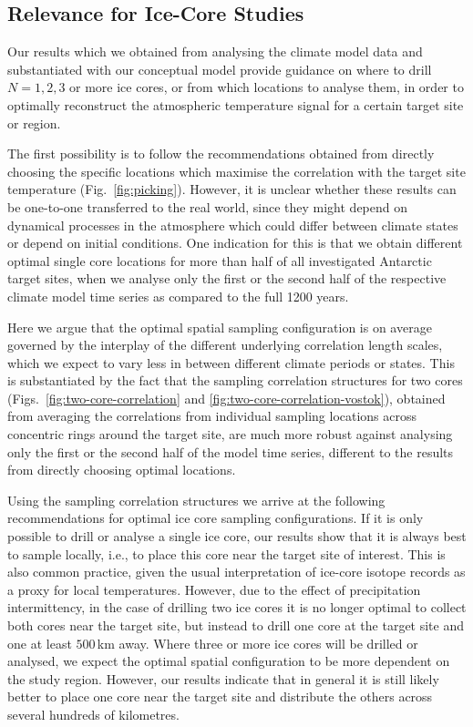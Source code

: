 \documentclass[draft]{agujournal2019}
\begin{document}
\subsection{Relevance for Ice-Core Studies}
\label{discussion:relevance}

Our results which we obtained from analysing the climate model data and
substantiated with our conceptual model provide guidance on where to drill
$N=1, 2, 3$ or more ice cores, or from which locations to analyse them, in order
to optimally reconstruct the atmospheric temperature signal for a certain target
site or region.

The first possibility is to follow the recommendations obtained from directly
choosing the specific locations which maximise the correlation with the target
site temperature (Fig.~\ref{fig:picking}). However, it is unclear whether these
results can be one-to-one transferred to the real world, since they might depend
on dynamical processes in the atmosphere which could differ between climate
states or depend on initial conditions. One indication for this is that we
obtain different optimal single core locations for more than half of all
investigated Antarctic target sites, when we analyse only the first or the
second half of the respective climate model time series as compared to the full
1200 years.

Here we argue that the optimal spatial sampling configuration is on average
governed by the interplay of the different underlying correlation length scales,
which we expect to vary less in between different climate periods or states.
This is substantiated by the fact that the sampling correlation structures for
two cores (Figs.~\ref{fig:two-core-correlation} and
\ref{fig:two-core-correlation-vostok}), obtained from averaging the correlations
from individual sampling locations  across concentric rings around the target
site, are much more robust against analysing only the first or the second half
of the model time series, different to the results from directly choosing
optimal locations.

Using the sampling correlation structures we arrive at the following
recommendations for optimal ice core sampling configurations. If it is only
possible to drill or analyse a single ice core, our results show that it is
always best to sample locally, i.e., to place this core near the target site of
interest. This is also common practice, given the usual interpretation of
ice-core isotope records as a proxy for local temperatures. However, due to the
effect of precipitation intermittency, in the case of drilling two ice cores it
is no longer optimal to collect both cores near the target site, but instead to
drill one core at the target site and one at least $500$\,km away. Where three
or more ice cores will be drilled or analysed, we expect the optimal spatial
configuration to be more dependent on the study region. However, our results
indicate that in general it is still likely better to place one core near the
target site and distribute the others across several hundreds of kilometres.
\end{document}
